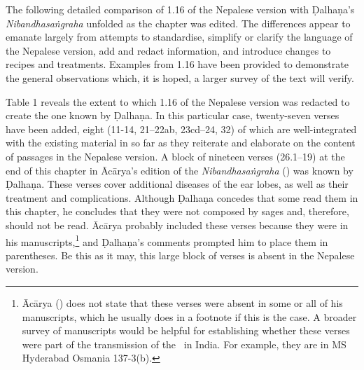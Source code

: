 The following detailed comparison of 1.16 of the Nepalese version with Ḍalhaṇa's \emph{Nibandhasaṅgraha} unfolded as the chapter was edited. The differences appear to emanate largely from attempts to standardise, simplify or clarify the language of the Nepalese version, add and redact information, and introduce changes to recipes and treatments. Examples from 1.16 have been provided to demonstrate the general observations which, it is hoped, a larger survey of the text will verify.

Table 1 reveals the extent to which 1.16 of the Nepalese version was redacted to create the one known by Ḍalhaṇa. In this particular case, twenty-seven verses have been added, eight (11-14, 21–22ab, 23cd–24, 32) of which are well-integrated with the existing material in so far as they reiterate and elaborate on the content of passages in the Nepalese version. A block of nineteen verses (26.1–19) at the end of this chapter in Ācārya's edition of the \emph{Nibandhasaṅgraha} (\cite[80]{vulgate}) was known by Ḍalhaṇa. These verses cover additional diseases of the ear lobes, as well as their treatment and complications. Although Ḍalhaṇa concedes that some read them in this chapter, he concludes that they were not composed by sages and, therefore, should not be read. Ācārya probably included these verses because they were in his manuscripts,\footnote{Ācārya (\cite[80]{vulgate}) does not state that these verses were absent in some or all of his manuscripts, which he usually does in a footnote if this is the case. A broader survey of manuscripts would be helpful for establishing whether these verses were part of the transmission of the \SS\ in India. For example, they are in MS Hyderabad Osmania 137-3(b).} and Ḍalhaṇa's comments prompted him to place them in parentheses. Be this as it may, this large block of verses is absent in the Nepalese version. 

